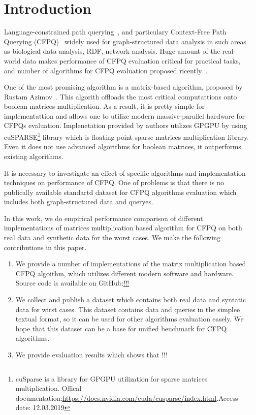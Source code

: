 \section{Introduction}

Language-constrained path querying~\cite{FLCpathProblem}, and particulary Context-Free Path Querying (CFPQ)~\cite{Yannakakis} widely used for graph-structured data analysis in such areas as biological data analysis, RDF, network analysis.
Huge amount of the real-world data makes performance of CFPQ evaluation critical for practical tasks, and number of algorithms for CFPQ evaluation proposed ricently~\cite{hellingsPathQuerying,Grigorev:2017:CPQ:3166094.3166104,Verbitskaia:2018:PCC:3241653.3241655,RDF,10.1007/978-3-319-91662-0_17,Medeiros:2018:EEC:3167132.3167265}.

One of the most promising algorithm is a matrix-based algorithm, proposed by Rustam Azimov~\cite{Azimov:2018:CPQ:3210259.3210264}.
This algorith offloads the most critical computattions onto boolean matrices multiplication.
As a result, it is pretty simple for implementattion and allows one to utilize modern massive-parallel hardware for CFPQs evaluation.
Implenetation provided by authors utilizes GPGPU by using cuSPARSE\footnote{cuSparse is a library for GPGPU utilization for sparse matrices multiplication. Offical documentation:\url{https://docs.nvidia.com/cuda/cusparse/index.html}.Access date: 12.03.2019} library which is floating point sparse matrices multiplication library.
Even it does not use advanced algorithms for boolean matrices, it outperforms existing algorithms.

It is necessary to investigate an effect of specific algorithms and implementation techniques on performance of CFPQ.
One of problems is that there is no publically available standartd dataset for CFPQ algorithms evaluation which includes both graph-structured data and queryes.

In this work, we do empirical performance comparison of different implementations of matrices multiplication based algorithm for CFPQ on both real data and synthetic data for the worst cases.
We make the following contributions in this paper.

\begin{enumerate}
\item We provide a number of implementations of the matrix multiplication based CFPQ algoithm, which utilizes different modern software and hardware. 
Source code is available on GitHub:\url{!!!}
\item We collect and publish a dataset which contains both real data and syntatic data for wirst cases.
This dataset contains data and queries in the simplee textual format, so it can be used for other algorithms evaluation easely.
We hope that this dataset can be a base for unified benchmark for CFPQ algorithms.
\item We provide evaluation results which shows that !!!
\end{enumerate}
